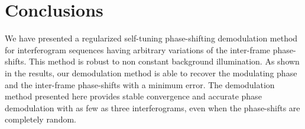 \documentclass[letterpaper,12pt]{article}   %
\begin{document}
\section{Conclusions}

We have presented a regularized self-tuning phase-shifting demodulation method for 
interferogram sequences having arbitrary variations of the inter-frame phase-shifts. 
This method is robust to non constant background illumination. As shown in the results,
our demodulation method is able to recover the modulating phase and the inter-frame 
phase-shifts with a minimum error. The demodulation method presented here provides 
stable convergence and accurate phase demodulation with as few as three interferograms,
even when the phase-shifts are completely random.



\end{document}
